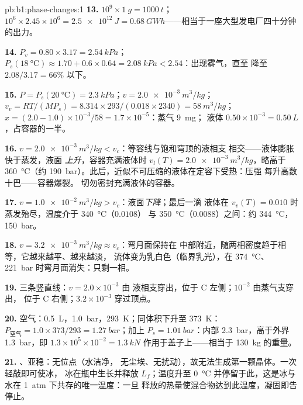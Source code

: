 \begin{solution}{pb:b1:phase-changes:1}
\textbf{13.} $10^9 \times \qty{1}{g} = \qty{1000}{t}$；$10^6 \times 2.45 \times 10^6 =
\qty{2.5e12}{J} = \qty{0.68}{GW h}$——相当于一座大型发电厂四十分钟的出力。

\textbf{14.} $P_v = 0.80 \times 3.17 = \qty{2.54}{kPa}$；$P_s(\qty{18}{\degreeCelsius})
\approx 1.70 + 0.6 \times 0.64 = \qty{2.08}{kPa} < 2.54$：出现雾气，直至
降至 $2.08/3.17 = 66\%$ 以下。

\textbf{15.} $P = P_s(\qty{20}{\degreeCelsius}) = \qty{2.3}{kPa}$；$v = \qty{2.0e-3}{m^3/kg}$；
$v_v = RT/(MP_s) = 8.314 \times 293/(0.018 \times 2340) = \qty{58}{m^3/kg}$；$x =
(2.0 - 1.0) \times 10^{-3}/58 = 1.7 \times 10^{-5}$：蒸气 \qty{9}{mg}；
液体 $0.50 \times 10^{-3} = \qty{0.50}{L}$，占容器的一半。

\textbf{16.} $v = \qty{2.0e-3}{m^3/kg} < v_c$：等容线与饱和穹顶的液相支
相交——液体膨胀快于蒸发，液面
\emph{上升}，容器充满液体时 $v_l(T) =
\qty{2.0e-3}{m^3/kg}$，略高于 \qty{360}{\degreeCelsius}（约
\qty{190}{bar}）。此后，近似不可压缩的液体在定容下受热：压强
每升高数十巴——容器爆裂。
切勿密封充满液体的容器。

\textbf{17.} $v = \qty{1.0e-2}{m^3/kg} > v_c$：液面\emph{下降}；最后一滴
液体在 $v_v(T) = 0.010$ 时蒸发殆尽，温度介于 \qty{340}{\degreeCelsius}（$0.0108$）
与 \qty{350}{\degreeCelsius}（$0.0088$）之间：约 \qty{344}{\degreeCelsius}，
\qty{150}{bar}。

\textbf{18.} $v = \qty{3.2e-3}{m^3/kg} \approx v_c$：弯月面保持在
中部附近，随两相密度趋于相等，它越来越平、越来越淡，
流体变为乳白色（临界乳光），在 \qty{374}{\degreeCelsius}、
\qty{221}{bar} 时弯月面消失：只剩一相。

\textbf{19.} 三条竖直线：$v = 2.0 \times 10^{-3}$ 由
液相支穿出，位于 C 左侧；$10^{-2}$ 由蒸气支穿出，
位于 C 右侧；$3.2 \times 10^{-3}$ 穿过顶点。

\textbf{20.} 空气：\qty{0.5}{L}，\qty{1.0}{bar}，\qty{293}{K}；同体积下升至
\qty{373}{K}：$P_{\text{空气}} = 1.0 \times 373/293 = \qty{1.27}{bar}$；加上
$P_s = \qty{1.01}{bar}$：内部 \qty{2.3}{bar}，高于外界
\qty{1.3}{bar}，即 $1.3 \times 10^5 \times 10^{-2} = \qty{1.3}{kN}$ 作用于盖子上——相当于
\qty{130}{kg} 的重量。

\textbf{21.} 、亚稳：无位点（水洁净，
无尘埃、无扰动），故无法生成第一颗晶体。一次轻敲即可使冰，
冰在瓶中生长并释放 $L_f$；温度升至
\qty{0}{\degreeCelsius} 并停留于此，这是冰与
水在 \qty{1}{atm} 下共存的唯一温度：一旦
释放的热量使混合物达到此温度，凝固即告停止。


\end{solution}
